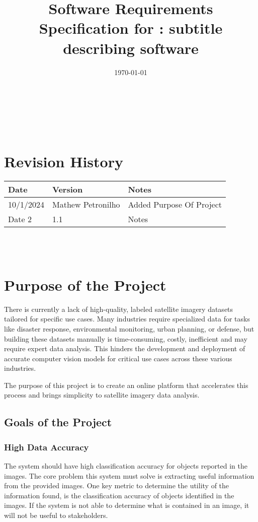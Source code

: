 \documentclass[12pt]{article}
\begin{document}
\title{Software Requirements Specification for \progname: subtitle describing software} 
\author{\authname}
\date{\today}
	
\maketitle

~\newpage


\tableofcontents

~\newpage

\section*{Revision History}

\begin{tabularx}{\textwidth}{p{3cm}p{2cm}X}
\toprule {\textbf{Date}} & {\textbf{Version}} & {\textbf{Notes}}\\
\midrule
10/1/2024 & Mathew Petronilho & Added Purpose Of Project\\
Date 2 & 1.1 & Notes\\
\bottomrule
\end{tabularx}

~\\

~\newpage
\section{Purpose of the Project}
There is currently a lack of high-quality, labeled satellite imagery datasets tailored for specific use cases. Many industries require specialized data for tasks like disaster 
response, environmental monitoring, urban planning, or defense, but building these datasets manually is time-consuming, costly, inefficient and may require expert data analysis. 
This hinders the development and deployment of accurate computer vision models for critical use cases across these various industries.

The purpose of this project is to create an online platform that accelerates this process and brings simplicity to satellite imagery data analysis.
\subsection{Goals of the Project}
\subsubsection{High Data Accuracy}
The system should have high classification accuracy for objects reported in the images. The core problem this system must solve is extracting useful information from the provided images.
 One key metric to determine the utility of the information found, is the classification accuracy of objects identified in the images. If the system is 
 not able to determine what is contained in an image, it will not be useful to stakeholders.
\end{document}
